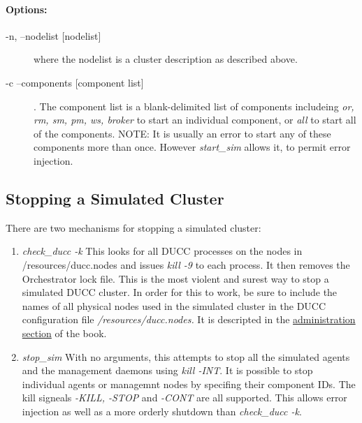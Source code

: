       \paragraph{Options:}
      \begin{description}
        \item[-n, --nodelist {[nodelist]}] where the nodelist is a cluster description as
          described above.
        \item[-c --components {[component list]}].  The component list is a blank-delimited
          list of components includeing {\em or, rm, sm, pm, ws, broker} to start an
          individual component, or {\em all} to start all of the components.  NOTE: It is
          usually an error to start any of these components more than once.  However 
          {\em start\_sim} allows it, to permit error injection.
      \end{description}
      
    \subsection{Stopping a Simulated Cluster}

    There are two mechanisms for stopping a simulated cluster:
    \begin{enumerate}
      \item {\em check\_ducc -k} This looks for all DUCC processes on the nodes in
        \ducchome/resources/ducc.nodes and issues {\em kill -9} to each process.  It
        then removes the Orchestrator lock file.  This is the most violent and
        surest way to stop a simulated DUCC cluster.  In order for this to work,
        be sure to include the names of all physical nodes used in the simulated cluster
        in the DUCC configuration file {\em \duccruntime/resources/ducc.nodes.}  It
        is descripted in the \hyperref[subsec:admin.check-ducc]{administration section} of the book.

      \item {\em stop\_sim} With no arguments, this attempts to stop all the simulated
        agents and the management daemons using {\em kill -INT}.  It is possible to
        stop individual agents or managemnt nodes by specifing their component IDs.
        The kill signeals {\em -KILL, -STOP} and {\em -CONT} are all supported.  This
        allows error injection as well as a more orderly shutdown than 
        {\em check\_ducc -k}.
    \end{enumerate}
    
